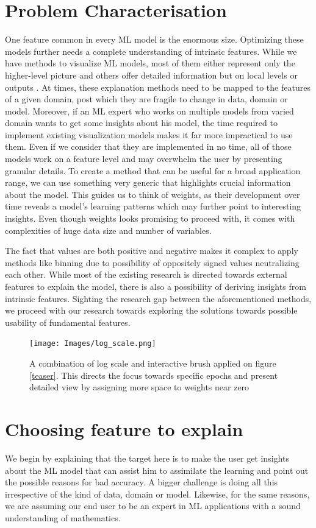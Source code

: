 \documentclass[journal]{vgtc}                %
\begin{document}
\section{Problem Characterisation}
One feature common in every ML model is the enormous size.
Optimizing these models further needs a complete understanding of intrinsic features.
While we have methods to visualize ML models, most of them either represent only the higher-level picture and others offer detailed information but on local levels or outputs \cite{xai3}.
At times, these explanation methods need to be mapped to the features of a given domain, post which they are fragile to change in data, domain or model. 
Moreover, if an ML expert who works on multiple models from varied domain wants to get some insights about his model, the time required to implement existing visualization models makes it far more impractical to use them. 
Even if we consider that they are implemented in no time, all of those models work on a feature level and may overwhelm the user by presenting granular details.
To create a method that can be useful for a broad application range,
we can use something very generic that highlights crucial information about the model. This guides us to think of weights,
as their development over time reveals a model's learning patterns which may further point to interesting insights.
Even though weights looks promising to proceed with, it comes with complexities of huge data size and number of variables.

The fact that values are both positive and negative makes it complex to apply methods like binning due to possibility of oppositely signed values neutralizing each other. 
While most of the existing research is directed towards external features to explain the model, there is also a possibility of deriving insights from intrinsic features. Sighting the research gap between the aforementioned methods, we proceed with our research towards exploring the solutions towards possible usability of fundamental features.

\begin{figure}
    \texttt{[image: Images/log\_scale.png]}
    \caption{A combination of log scale and interactive brush applied on figure \ref{teaser}. This directs the focus towards specific epochs and present detailed view by assigning more space to weights near zero}
    \label{fig:log_scale}
\end{figure}

\section{Choosing feature to explain   }%
We begin by explaining that the target here is to make the user get insights about the ML model\cite{mein}
that can assist him to assimilate the learning and point out the possible reasons for bad accuracy. A bigger challenge is doing all this irrespective of the kind of data, domain or model. Likewise, for the same reasons, we are assuming our end user to be an expert in ML applications with a sound understanding of mathematics.
\end{document}
